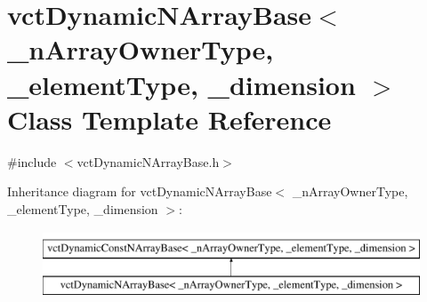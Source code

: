 \hypertarget{classvct_dynamic_n_array_base}{\section{vct\-Dynamic\-N\-Array\-Base$<$ \-\_\-n\-Array\-Owner\-Type, \-\_\-element\-Type, \-\_\-dimension $>$ Class Template Reference}
\label{classvct_dynamic_n_array_base}
}


{\ttfamily \#include $<$vct\-Dynamic\-N\-Array\-Base.\-h$>$}

Inheritance diagram for vct\-Dynamic\-N\-Array\-Base$<$ \-\_\-n\-Array\-Owner\-Type, \-\_\-element\-Type, \-\_\-dimension $>$\-:\begin{figure}[H]
\begin{center}
\leavevmode
\includegraphics[height=2.000000cm]{da/dfb/classvct_dynamic_n_array_base}
\end{center}
\end{figure}
